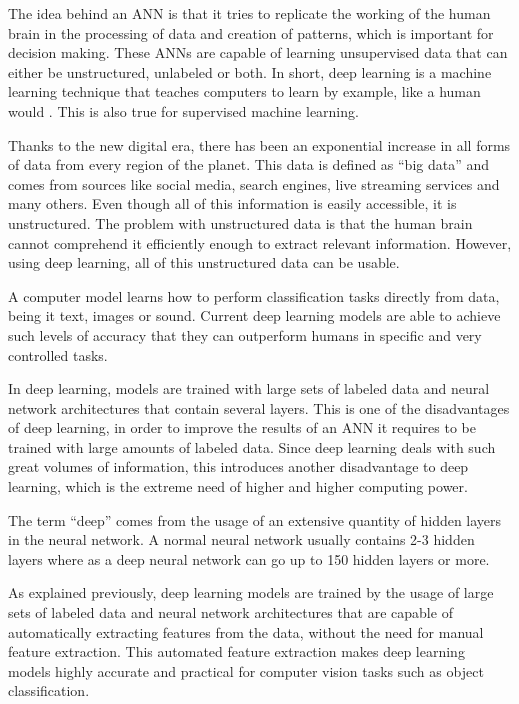    \par The idea behind an ANN is that it tries to replicate the working of the human brain in the processing of data and creation of patterns, which is important for decision making. These ANNs are capable of learning unsupervised data that can either be unstructured, unlabeled or both. In short, deep learning is a machine learning technique that teaches computers to learn by example, like a human would \cite{mathworks_deeplearning}. This is also true for supervised machine learning.


    \par Thanks to the new digital era, there has been an exponential increase in all forms of data from every region of the planet. This data is defined as \enquote{big data} and comes from sources like social media, search engines, live streaming services and many others. Even though all of this information is easily accessible, it is unstructured. The problem with unstructured data is that the human brain cannot comprehend it efficiently enough to extract relevant information. However, using deep learning, all of this unstructured data can be usable.

    \par A computer model learns how to perform classification tasks directly from data, being it text, images or sound. Current deep learning models are able to achieve such levels of accuracy that they can outperform humans in specific and very controlled tasks.

    \par In deep learning, models are trained with large sets of labeled data and neural network architectures that contain several layers. This is one of the disadvantages of deep learning, in order to improve the results of an ANN it requires to be trained with large amounts of labeled data. Since deep learning deals with such great volumes of information, this introduces another disadvantage to deep learning, which is the extreme need of higher and higher computing power.

   
        
    \par The term \enquote{deep} comes from the usage of an extensive quantity of hidden layers in the neural network. A normal neural network usually contains 2-3 hidden layers where as a deep neural network can go up to 150 hidden layers or more.

    \par As explained previously, deep learning models are trained by the usage of  large sets of labeled data and neural network architectures that are capable of automatically extracting features from the data, without the need for manual feature extraction. This automated feature extraction makes deep learning models highly accurate and practical for computer vision tasks such as object classification. 
    
